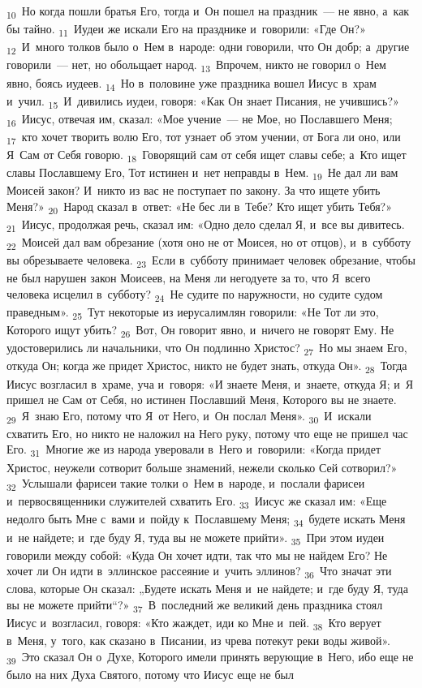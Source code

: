 \documentclass[a4paper,12pt]{article}
\begin{document}
 \textsubscript{10}~Но когда пошли братья Его, тогда и~Он пошел на праздник~--- не явно, а~как бы тайно. \textsubscript{11}~Иудеи же искали Его на празднике и~говорили: «Где Он?» \textsubscript{12}~И~много толков было о~Нем в~народе: одни говорили, что Он добр; а~другие говорили~--- нет, но обольщает народ. \textsubscript{13}~Впрочем, никто не говорил о~Нем явно, боясь иудеев. \textsubscript{14}~Но в~половине уже праздника вошел Иисус в~храм и~учил. \textsubscript{15}~И~дивились иудеи, говоря: «Как Он знает Писания, не учившись?» \textsubscript{16}~Иисус, отвечая им, сказал: «Мое учение~--- не Мое, но Пославшего Меня; \textsubscript{17}~кто хочет творить волю Его, тот узнает об этом учении, от Бога ли оно, или Я~Сам от Себя говорю. \textsubscript{18}~Говорящий сам от себя ищет славы себе; а~Кто ищет славы Пославшему Его, Тот истинен и~нет неправды в~Нем. \textsubscript{19}~Не дал ли вам Моисей закон? И~никто из вас не поступает по закону. За что ищете убить Меня?» \textsubscript{20}~Народ сказал в~ответ: «Не бес ли в~Тебе? Кто ищет убить Тебя?» \textsubscript{21}~Иисус, продолжая речь, сказал им: «Одно дело сделал Я, и~все вы дивитесь. \textsubscript{22}~Моисей дал вам обрезание (хотя оно не от Моисея, но от отцов), и~в~субботу вы обрезываете человека. \textsubscript{23}~Если в~субботу принимает человек обрезание, чтобы не был нарушен закон Моисеев, на Меня ли негодуете за то, что Я~всего человека исцелил в~субботу? \textsubscript{24}~Не судите по наружности, но судите судом праведным». \textsubscript{25}~Тут некоторые из иерусалимлян говорили: «Не Тот ли это, Которого ищут убить? \textsubscript{26}~Вот, Он говорит явно, и~ничего не говорят Ему. Не удостоверились ли начальники, что Он подлинно Христос? \textsubscript{27}~Но мы знаем Его, откуда Он; когда же придет Христос, никто не будет знать, откуда Он». \textsubscript{28}~Тогда Иисус возгласил в~храме, уча и~говоря: «И знаете Меня, и~знаете, откуда Я; и~Я пришел не Сам от Себя, но истинен Пославший Меня, Которого вы не знаете. \textsubscript{29}~Я~знаю Его, потому что Я~от Него, и~Он послал Меня». \textsubscript{30}~И~искали схватить Его, но никто не наложил на Него руку, потому что еще не пришел час Его. \textsubscript{31}~Многие же из народа уверовали в~Него и~говорили: «Когда придет Христос, неужели сотворит больше знамений, нежели сколько Сей сотворил?» \textsubscript{32}~Услышали фарисеи такие толки о~Нем в~народе, и~послали фарисеи и~первосвященники служителей схватить Его. \textsubscript{33}~Иисус же сказал им: «Еще недолго быть Мне с~вами и~пойду к~Пославшему Меня; \textsubscript{34}~будете искать Меня и~не найдете; и~где буду Я, туда вы не можете прийти». \textsubscript{35}~При этом иудеи говорили между собой: «Куда Он хочет идти, так что мы не найдем Его? Не хочет ли Он идти в~эллинское рассеяние и~учить эллинов? \textsubscript{36}~Что значат эти слова, которые Он сказал: „Будете искать Меня и~не найдете; и~где буду Я, туда вы не можете прийти“?» \textsubscript{37}~В~последний же великий день праздника стоял Иисус и~возгласил, говоря: «Кто жаждет, иди ко Мне и~пей. \textsubscript{38}~Кто верует в~Меня, у~того, как сказано в~Писании, из чрева потекут реки воды живой». \textsubscript{39}~Это сказал Он о~Духе, Которого имели принять верующие в~Него, ибо еще не было на них Духа Святого, потому что Иисус еще не был 
\end{document}
